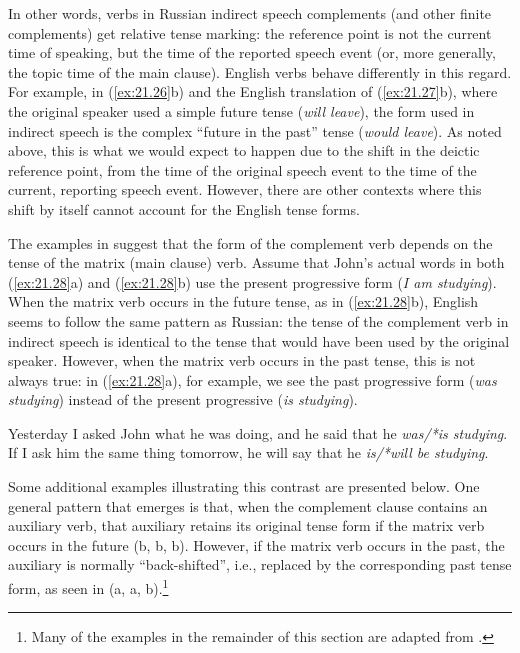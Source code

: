 In other words, verbs in Russian indirect speech complements (and other finite complements) get relative tense marking: the reference point is not the current time of speaking, but the time of the reported speech event (or, more generally, the topic time of the main clause). English verbs behave differently in this regard. For example, in (\ref{ex:21.26}b) and the English translation of (\ref{ex:21.27}b), where the original speaker used a simple future tense (\textit{will leave}), the form used in indirect speech is the complex “future in the past” tense (\textit{would leave}). As noted above, this is what we would expect to happen due to the shift in the deictic reference point, from the time of the original speech event to the time of the current, reporting speech event. However, there are other contexts where this shift by itself cannot account for the English tense forms.



The examples in  suggest that the form of the complement verb depends on the tense of the matrix (main clause) verb. Assume that John’s actual words in both (\ref{ex:21.28}a) and (\ref{ex:21.28}b) use the present progressive form (\textit{I am studying}). When the matrix verb occurs in the future tense, as in (\ref{ex:21.28}b), English seems to follow the same pattern as Russian: the tense of the complement verb in indirect speech is identical to the tense that would have been used by the original speaker. However, when the matrix verb occurs in the past tense, this is not always true: in (\ref{ex:21.28}a), for example, we see the past progressive form (\textit{was studying}) instead of the present progressive (\textit{is studying}).


\ea \label{ex:21.28}
\ea  Yesterday I asked John what he was doing, and he said that he \textit{was/*is studying}.\\
\ex If I ask him the same thing tomorrow, he will say that he \textit{is/*will be studying}.
                       \z
\z


Some additional examples illustrating this contrast are presented below. One general pattern that emerges is that, when the complement clause contains an auxiliary verb, that auxiliary retains its original tense form if the matrix verb occurs in the future (b, b, b). However, if the matrix verb occurs in the past, the auxiliary is normally “back-shifted”, i.e., replaced by the corresponding past tense form, as seen in (a, a, b).\footnote{Many of the examples in the remainder of this section are adapted from \citet{Declerck1991}.}


